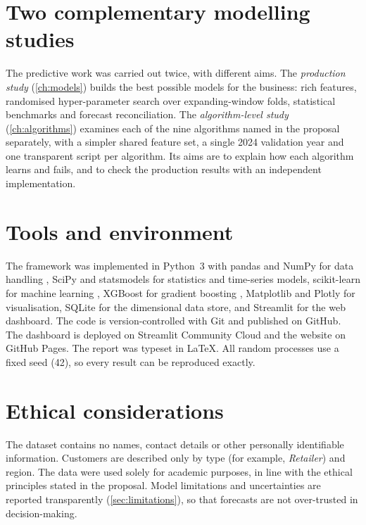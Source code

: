 \section{Two complementary modelling studies}
The predictive work was carried out twice, with different aims. The \emph{production study}
(\cref{ch:models}) builds the best possible models for the business: rich features, randomised hyper-parameter
search over expanding-window folds, statistical benchmarks and forecast reconciliation. The
\emph{algorithm-level study} (\cref{ch:algorithms}) examines each of the nine algorithms named in the proposal
separately, with a simpler shared feature set, a single 2024 validation year and one transparent script per
algorithm. Its aims are to explain how each algorithm learns and fails, and to check the production results
with an independent implementation.

\section{Tools and environment}
The framework was implemented in Python~3 with pandas and NumPy for data handling \citep{mckinney2022},
SciPy and statsmodels for statistics and time-series models, scikit-learn for machine learning
\citep{pedregosa2011}, XGBoost for gradient boosting \citep{chen2016}, Matplotlib and Plotly for
visualisation, SQLite for the dimensional data store, and Streamlit for the web dashboard. The code is
version-controlled with Git and published on GitHub. The dashboard is deployed on Streamlit Community Cloud and
the website on GitHub Pages. The report was typeset in \LaTeX. All random processes use a fixed seed (42), so every result can be reproduced exactly.

\section{Ethical considerations}
The dataset contains no names, contact details or other personally identifiable information. Customers are
described only by type (for example, \emph{Retailer}) and region. The data were used solely for academic
purposes, in line with the ethical principles stated in the proposal. Model limitations and uncertainties are
reported transparently (\cref{sec:limitations}), so that forecasts are not over-trusted in decision-making.
